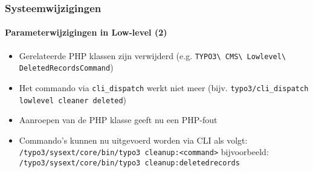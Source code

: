 \begin{frame}[fragile]
	\frametitle{Systeemwijzigingen}
	\framesubtitle{Parameterwijzigingen in Low-level (2)}


	\begin{itemize}
		\item Gerelateerde PHP klassen zijn verwijderd\newline
			\smaller(e.g. \texttt{TYPO3\textbackslash
				CMS\textbackslash
				Lowlevel\textbackslash
				DeletedRecordsCommand})
			\normalsize

		\item Het commando via \texttt{cli\_dispatch} werkt niet meer\newline
			\smaller(bijv. \texttt{typo3/cli\_dispatch lowlevel cleaner deleted})\normalsize
		\item Aanroepen van de PHP klasse geeft nu een PHP-fout

		\item Commando's kunnen nu uitgevoerd worden via CLI als volgt:\newline
			\smaller\texttt{/typo3/sysext/core/bin/typo3 cleanup:<command>}\normalsize\newline
			bijvoorbeeld:\newline
			\smaller\texttt{/typo3/sysext/core/bin/typo3 cleanup:deletedrecords}\normalsize

	\end{itemize}

\end{frame}




